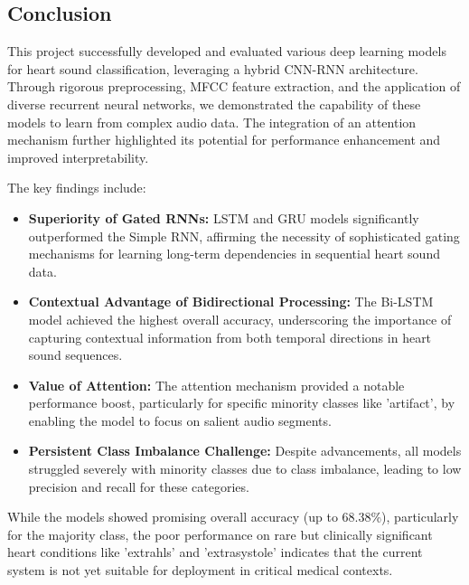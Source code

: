 \documentclass[a4paper]{article}
\begin{document}
\begin{multicols}{2}
\section{Conclusion}
This project successfully developed and evaluated various deep learning models for heart sound classification, leveraging a hybrid CNN-RNN architecture. Through rigorous preprocessing, MFCC feature extraction, and the application of diverse recurrent neural networks, we demonstrated the capability of these models to learn from complex audio data. The integration of an attention mechanism further highlighted its potential for performance enhancement and improved interpretability.

The key findings include:
\begin{itemize}
    \item \textbf{Superiority of Gated RNNs:} LSTM and GRU models significantly outperformed the Simple RNN, affirming the necessity of sophisticated gating mechanisms for learning long-term dependencies in sequential heart sound data.
    \item \textbf{Contextual Advantage of Bidirectional Processing:} The Bi-LSTM model achieved the highest overall accuracy, underscoring the importance of capturing contextual information from both temporal directions in heart sound sequences.
    \item \textbf{Value of Attention:} The attention mechanism provided a notable performance boost, particularly for specific minority classes like 'artifact', by enabling the model to focus on salient audio segments.
    \item \textbf{Persistent Class Imbalance Challenge:} Despite advancements, all models struggled severely with minority classes due to class imbalance, leading to low precision and recall for these categories.
\end{itemize}

While the models showed promising overall accuracy (up to 68.38\%), particularly for the majority class, the poor performance on rare but clinically significant heart conditions like 'extrahls' and 'extrasystole' indicates that the current system is not yet suitable for deployment in critical medical contexts.


\end{multicols}
\end{document}
